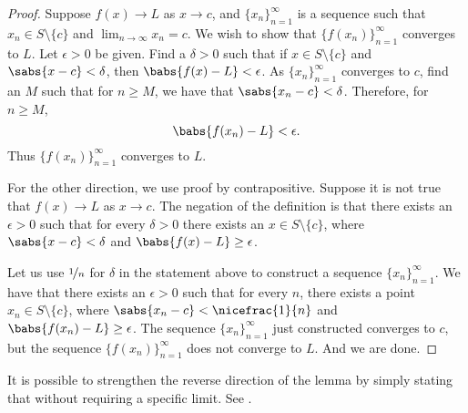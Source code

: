 \begin{proof}
Suppose 
$f(x) \to L$ as $x \to c$, and $\{ x_n \}_{n=1}^\infty$ is a sequence
such that
$x_n \in S \setminus \{c\}$ and
$\lim_{n\to\infty} x_n = c$.
We wish to show that $\bigl\{ f(x_n) \bigr\}_{n=1}^\infty$ converges to $L$.
Let $\epsilon > 0$ be given.  Find a $\delta > 0$ such that
if $x \in S \setminus \{c\}$ and $\sabs{x-c} < \delta$, then
$\babs{f(x) - L} < \epsilon$.  As
$\{ x_n \}_{n=1}^\infty$  converges to $c$, find an $M$ such that for $n \geq M$,
we have that $\sabs{x_n - c} < \delta$.  Therefore, for $n \geq M$,
\begin{equation*}
\babs{f(x_n) - L} < \epsilon .
\end{equation*}
Thus $\bigl\{ f(x_n) \bigr\}_{n=1}^\infty$ converges to $L$.

For the other direction, we use proof by contrapositive.  Suppose 
it is not true that $f(x) \to L$ as $x \to c$.  The negation of the
definition is that there exists an $\epsilon > 0$ such that for every
$\delta > 0$ there exists an $x \in S \setminus \{c\}$, where
$\sabs{x-c} < \delta$
and $\babs{f(x)-L} \geq \epsilon$.

Let us use $\nicefrac{1}{n}$ for $\delta$ in the statement above to
construct a sequence $\{ x_n \}_{n=1}^\infty$.  We have
that there exists an $\epsilon > 0$ such that for every $n$,
there exists a point $x_n \in S \setminus \{c\}$, where
$\sabs{x_n-c} < \nicefrac{1}{n}$
and $\babs{f(x_n)-L} \geq \epsilon$.
The sequence $\{ x_n \}_{n=1}^\infty$ just constructed converges to $c$, but
the sequence $\bigl\{ f(x_n) \bigr\}_{n=1}^\infty$ does not converge to $L$.
And we are done.
\end{proof}

It is possible to strengthen the reverse direction of
the lemma by simply stating that
 without requiring a specific limit.
See .

